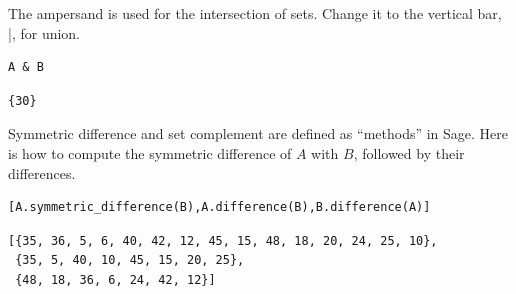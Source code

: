 \documentclass[10pt,]{book}
\theoremstyle{plain}
\theoremstyle{definition}
\theoremstyle{definition}
\theoremstyle{definition}
\theoremstyle{definition}
\begin{document}
The ampersand is used for the intersection of sets.  Change it to the vertical bar, |, for union. 
%
\begin{lstlisting}[style=sageinput]
A & B
\end{lstlisting}
\begin{lstlisting}[style=sageoutput]
{30}
\end{lstlisting}
\par
Symmetric difference and set complement are defined as ``methods'' in Sage. Here is how to compute the symmetric difference of \(A\)  with  \(B\), followed by their differences.%
\begin{lstlisting}[style=sageinput]
[A.symmetric_difference(B),A.difference(B),B.difference(A)]
\end{lstlisting}
\begin{lstlisting}[style=sageoutput]
[{35, 36, 5, 6, 40, 42, 12, 45, 15, 48, 18, 20, 24, 25, 10},
 {35, 5, 40, 10, 45, 15, 20, 25},
 {48, 18, 36, 6, 24, 42, 12}]
\end{lstlisting}
\typeout{************************************************}
\typeout{************************************************}
\end{document}
